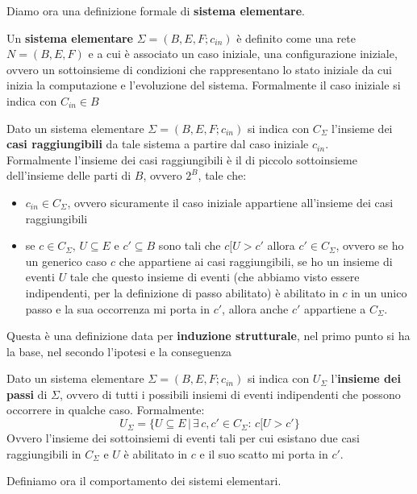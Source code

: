\documentclass[a4paper,12pt, oneside]{book}
\begin{document}
Diamo ora una definizione formale di \textbf{sistema elementare}.
\begin{definizione}
  Un \textbf{sistema elementare} $\Sigma=(B,E,F;c_{in})$ è definito come una
  rete $N=(B,E,F)$ e a cui è associato un caso iniziale, una configurazione
  iniziale, ovvero un sottoinsieme di condizioni che rappresentano lo stato
  iniziale da cui inizia la computazione e l'evoluzione del sistema. Formalmente
  il caso iniziale si indica con $C_{in}\in B$ 
\end{definizione}
\begin{definizione}
  Dato un sistema elementare $\Sigma=(B,E,F;c_{in})$ si indica con $C_\Sigma$
  l'insieme dei \textbf{casi raggiungibili} da tale sistema a partire dal caso
  iniziale $c_{in}$.\\
  Formalmente l'insieme dei casi raggiungibili è il di piccolo sottoinsieme
  dell'insieme delle parti di $B$, ovvero $2^B$, tale che:
  \begin{itemize}
    \item $c_{in}\in C_\Sigma$, ovvero sicuramente il caso iniziale appartiene
    all'insieme dei casi raggiungibili
    \item se $c\in C_\Sigma,\,U\subseteq E$ e $c'\subseteq B$ sono tali che
    $c[U>c'$ allora $c'\in C_\Sigma$, ovvero se ho un generico caso $c$ che
    appartiene ai casi raggiungibili, se ho un insieme di eventi $U$ tale che
    questo insieme di eventi (che abbiamo visto essere indipendenti, per la
    definizione di passo abilitato) è abilitato
    in $c$ in un unico passo e la sua occorrenza mi porta in $c'$, allora anche
    $c'$ appartiene a $C_\Sigma$. 
  \end{itemize}
  Questa è una definizione data per \textbf{induzione strutturale}, nel primo
  punto si ha la base, nel secondo l'ipotesi e la conseguenza
\end{definizione}
\begin{definizione}
  Dato un sistema elementare $\Sigma=(B,E,F;c_{in})$ si indica con $U_\Sigma$
  l'\textbf{insieme dei passi} di $\Sigma$, ovvero di tutti i possibili insiemi
  di eventi indipendenti che possono occorrere in qualche caso. Formalmente:
  \[U_\Sigma =\{U\subseteq E\,|\,\exists\, c,c'\in C_\Sigma :\, c[U>c'\}\]
  Ovvero l'insieme dei sottoinsiemi di eventi tali per cui esistano due casi
  raggiungibili in $C_\Sigma$ e $U$ è abilitato in $c$ e il suo scatto mi porta
  in $c'$.
\end{definizione}
Definiamo ora il comportamento dei sistemi elementari.
\end{document}
